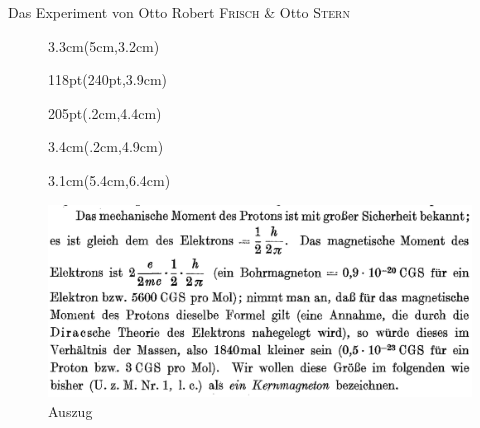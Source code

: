 \documentclass[t,9pt]{beamer}
\newcommand{\highlight}[3]{ \begin{textblock*}{#1}(#2,#3) \begin{tcolorbox} [enhanced,opacityfill=.1,colback=blue] \end{tcolorbox} \end{textblock*} } %
\begin{document}

        \begin{frame}{Das Experiment von Otto Robert \textsc{Frisch} \& Otto \textsc{Stern}}
                \begin{figure}
                        \highlight{3.3cm}{5cm}{3.2cm}
                        \highlight{118pt}{240pt}{3.9cm}
                        \highlight{205pt}{.2cm}{4.4cm}
                        \highlight{3.4cm}{.2cm}{4.9cm}
                        \highlight{3.1cm}{5.4cm}{6.4cm}
                        \includegraphics[width=\textwidth]{prosi_proton_als_dirac_teilchen.png}
                        \caption*{Auszug \cite{FrischStern1933}}
                \end{figure}
        \end{frame}
\end{document}
